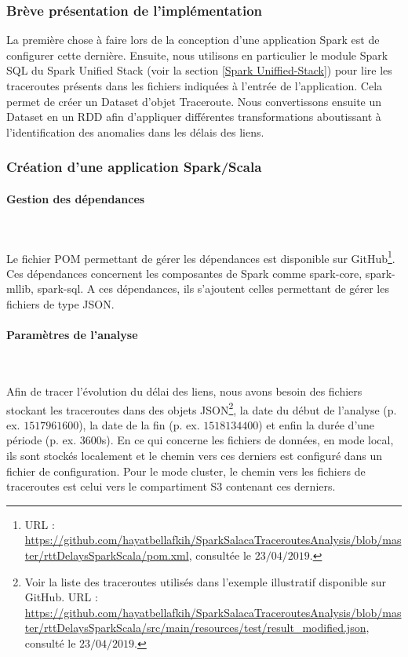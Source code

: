 \subsubsection{Brève présentation  de l'implémentation}

La première chose à faire lors de la conception d'une application Spark est de configurer cette dernière. Ensuite, nous utilisons en particulier le module  Spark SQL  du Spark Unified Stack (voir la section \ref{Spark Uniffied-Stack}) pour lire les traceroutes présents dans les fichiers indiquées à l'entrée de l'application. Cela permet de créer un Dataset d'objet Traceroute.  Nous convertissons ensuite un Dataset en un RDD afin d'appliquer différentes transformations aboutissant à l'identification des anomalies dans les délais des liens.

\subsubsection{Création d'une application Spark/Scala}

\paragraph{Gestion des dépendances}~

Le fichier POM permettant de gérer les dépendances est disponible sur GitHub\footnote{URL : \url{https://github.com/hayatbellafkih/SparkSalacaTraceroutesAnalysis/blob/master/rttDelaysSparkScala/pom.xml}, consultée le $23/04/2019$.}. Ces dépendances concernent les composantes de Spark comme spark-core, spark-mllib, spark-sql. A ces dépendances, ils s'ajoutent celles permettant de gérer les fichiers de type JSON. 

\paragraph{Paramètres de l'analyse}~

Afin de tracer l'évolution du délai des liens, nous avons besoin des fichiers stockant les  traceroutes  dans  des objets JSON\footnote{Voir la liste des traceroutes utilisés dans l'exemple illustratif disponible sur GitHub. URL : \url{https://github.com/hayatbellafkih/SparkSalacaTraceroutesAnalysis/blob/master/rttDelaysSparkScala/src/main/resources/test/result_modified.json}, consulté le $23/04/2019$.}, la date du début de l'analyse (p. ex. $ 1517961600 $), la date de la fin (p. ex. $ 1518134400 $) et enfin la durée d'une période (p. ex. $3600$s). En ce qui concerne les fichiers de données, en mode local, ils sont stockés localement et le chemin vers ces derniers est configuré dans un fichier de configuration. Pour le mode cluster, le chemin vers les fichiers de traceroutes est celui vers le compartiment S3 contenant ces derniers.


